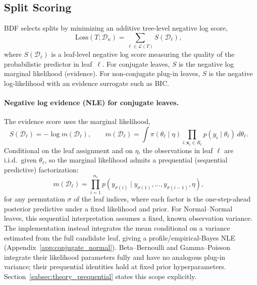 \documentclass[10pt]{article} %
\begin{document}
\subsection{Split Scoring}\label{subsec:split_scoring}

BDF selects splits by minimizing an additive tree-level negative log score,
\begin{equation}\label{eq:additive_tree_score}
\mathrm{Loss}(T;\mathcal{D}_n)
=
\sum_{\ell\in\mathcal{L}(T)} S(\mathcal{D}_\ell),
\end{equation}
where $S(\mathcal{D}_\ell)$ is a leaf-level negative log score measuring the quality of the probabilistic predictor in leaf~$\ell$. For conjugate leaves, $S$ is the negative log marginal likelihood (evidence). For non-conjugate plug-in leaves, $S$ is the negative log-likelihood with an evidence surrogate such as BIC.

\paragraph{Negative log evidence (NLE) for conjugate leaves.}
The evidence score uses the marginal likelihood,
\begin{equation}\label{eq:nle_leaf}
S(\mathcal{D}_\ell)
=
-\log m(\mathcal{D}_\ell),
\qquad
m(\mathcal{D}_\ell)
=
\int \pi(\theta_\ell\mid\eta)\prod_{i:\mathbf{x}_i\in R_\ell}p(y_i\mid\theta_\ell)\,d\theta_\ell.
\end{equation}
Conditional on the leaf assignment and on $\eta$, the observations in leaf $\ell$ are i.i.d.\ given $\theta_\ell$, so the marginal likelihood admits a prequential (sequential predictive) factorization:
\begin{equation}\label{eq:prequential}
m(\mathcal{D}_\ell)
= \prod_{i=1}^{n_\ell} p(y_{\sigma(i)} \mid y_{\sigma(1)},\dots,y_{\sigma(i-1)},\eta),
\end{equation}
for any permutation $\sigma$ of the leaf indices, where each factor is the one-step-ahead posterior predictive under a fixed likelihood and prior. For Normal--Normal leaves, this sequential interpretation assumes a fixed, known observation variance. The implementation instead integrates the mean conditional on a variance estimated from the full candidate leaf, giving a profile/empirical-Bayes NLE (Appendix~\ref{app:conjugate_normal}). Beta--Bernoulli and Gamma--Poisson integrate their likelihood parameters fully and have no analogous plug-in variance; their prequential identities hold at fixed prior hyperparameters. Section~\ref{subsec:theory_prequential} states this scope explicitly.
\end{document}
